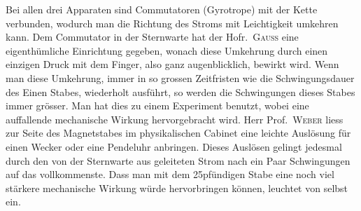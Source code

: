 Bei allen drei Apparaten sind Commutatoren (Gyrotrope) mit der Kette verbunden, wodurch man die Richtung des Stroms mit Leichtigkeit umkehren kann. Dem Commutator in der Sternwarte hat der Hofr.\ \textsc{Gauss} eine eigenthümliche Einrichtung gegeben, wonach diese Umkehrung durch einen einzigen Druck mit dem Finger, also ganz augenblicklich, bewirkt wird. Wenn man diese Umkehrung, immer in so grossen Zeitfristen wie die Schwingungsdauer des Einen Stabes, wiederholt ausführt, so werden die Schwingungen dieses Stabes immer grösser. Man hat dies zu einem Experiment benutzt, wobei eine auffallende mechanische Wirkung hervorgebracht wird. Herr Prof.\ \textsc{Weber} liess zur Seite des Magnetstabes im physikalischen Cabinet eine leichte Auslösung für einen Wecker oder eine Pendeluhr anbringen. Dieses Auslösen gelingt jedesmal durch den von der Sternwarte aus geleiteten Strom nach ein Paar Schwingungen auf das vollkommenste. Dass man mit dem 25pfündigen Stabe eine noch viel stärkere mechanische Wirkung würde hervorbringen können, leuchtet von selbst ein.

